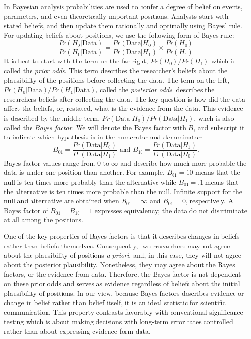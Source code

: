\documentclass[fignum,nobf,man]{apa}
\begin{document}
In Bayesian analysis probabilities are used to confer a degree of belief on events, parameters, and even theoretically important positions.  Analysts start with stated beliefs, and then update them rationally and optimally using Bayes' rule.  For updating beliefs about positions, we use the following form of Bayes rule:
\begin{equation}
\frac{Pr(H_0 | \mbox{Data})}{Pr(H_1 | \mbox{Data})} = \frac{Pr(\mbox{Data} | H_0)}{Pr(\mbox{Data} | H_1)} \times \frac{Pr(H_0)}{Pr (H_1)} 
\end{equation}
It is best to start with the term on the far right, $Pr(H_0)/Pr(H_1)$ which is called the {\em prior odds}.  This term describes the researcher's beliefs about the plausibility of the positions before collecting the data.  The term on the left, $Pr(H_0 | \mbox{Data})/Pr(H_1 | \mbox{Data})$, called the {\em posterior odds}, describes the researchers beliefs after collecting the data.   The key question is how did the data affect the beliefs, or, restated, what is the evidence from the data.  This evidence is described by the middle term,  $Pr(\mbox{Data} | H_0)/Pr(\mbox{Data} | H_1)$, whch is also called the {\em Bayes factor}.  We will denote the Bayes factor with $B$, and subscript it to indicate which hypothesis is in the numerator and denominator:
\[
B_{01} = \frac{Pr(\mbox{Data} | H_0)}{Pr(\mbox{Data} | H_1)} \mbox{ and } B_{10} = \frac{Pr(\mbox{Data} | H_1)}{Pr(\mbox{Data} | H_0)}.
\]
Bayes factor values range from 0 to $\infty$ and describe how much more probable the data is under one position than another.  For example, $B_{01}=10$ means that the null is ten times more probably than the alternative while $B_{01}=.1$ means that the alternative is ten times more probable than the null.  Infinite support for the null and alternative are obtained when $B_{01}=\infty$ and $B_{01}=0$, respectively.  A Bayes factor of $B_{01}=B_{10}=1$ expresses equivalency; the data do not discriminate at all among the positions.

One of the key properties of Bayes factors is that it describes changes in beliefs rather than beliefs themselves.  Consequently, two researchers may not agree about the plausibility of positions {\em a priori}, and, in this case, they will not agree about the posterior plausibility.  Nonetheless, they may agree about the Bayes factors, or the evidence from data.  Therefore, the Bayes factor is not dependent on these prior odds and serves as evidence regardless of beliefs about the initial plausibility of positions.  In our view, because Bayes factors describes evidence or change in belief rather than belief itself, it is an ideal statistic for scientific communication.  This property contrasts favorably with conventional significance testing which is about making decisions with long-term error rates controlled rather than about expressing evidence form data. 
\end{document}
